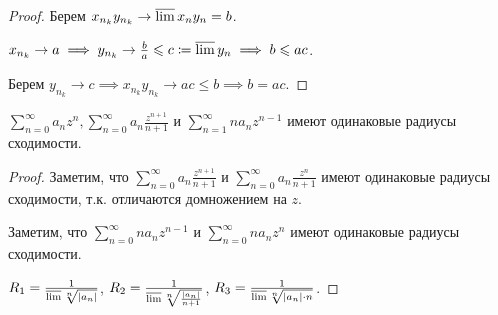 \begin{proof}
    Берем $x_{n_k}y_{n_k} \to \varlimsup x_n y_n = b$.

    $x_{n_k} \to a \implies y_{n_k} \to \frac{b}{a} \le c \coloneqq \varlimsup y_n \implies b \le ac$.

    Берем $y_{n_k} \to c \implies x_{n_k}y_{n_k} \to ac \le b \implies b = ac$.
\end{proof}
\begin{consequence}
    $\sum\limits_{n=0}^\infty a_n z^n, \sum\limits_{n=0}^\infty a_n \frac{z^{n+1}}{n+1}$ и $\sum\limits_{n=1}^\infty na_n z^{n-1}$ имеют одинаковые радиусы сходимости.
\end{consequence}
\begin{proof}
    Заметим, что $\sum\limits_{n=0}^\infty a_n \frac{z^{n+1}}{n+1}$ и $\sum\limits_{n=0}^\infty a_n \frac{z^{n}}{n+1}$ имеют одинаковые радиусы сходимости, т.к. отличаются домножением на $z$.

    Заметим, что  $\sum\limits_{n=0}^\infty n a_n z^{n-1}$ и  $\sum\limits_{n=0}^\infty n a_n z^{n}$ имеют одинаковые радиусы сходимости.

    $R_1 = \frac{1}{\varlimsup \sqrt[n]{|a_n|}}$, $R_2 = \frac{1}{\varlimsup \sqrt[n]{\frac{|a_n|}{n+1}}}$, $R_3 = \frac{1}{\varlimsup \sqrt[n]{|a_n| \cdot n}}$.
\end{proof}

